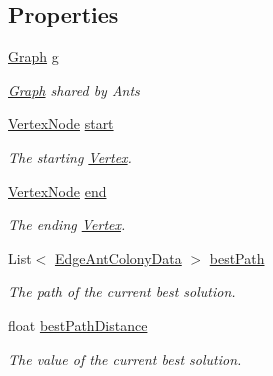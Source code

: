 \subsection*{Properties}
\begin{DoxyCompactItemize}
\item 
\hyperlink{classGraph}{Graph} \hyperlink{classCommonKnowledge_afe6268d0091d9477d594b7207a9b0d8b}{g}
\begin{DoxyCompactList}\small\item\em \hyperlink{classGraph}{Graph} shared by Ants\end{DoxyCompactList}\item 
\hyperlink{classVertexNode}{Vertex\+Node} \hyperlink{classCommonKnowledge_a968607c5b3027dc7db9178375a2071f2}{start}
\begin{DoxyCompactList}\small\item\em The starting \hyperlink{structVertex}{Vertex}.\end{DoxyCompactList}\item 
\hyperlink{classVertexNode}{Vertex\+Node} \hyperlink{classCommonKnowledge_a32a5f87ad72c95bbe3e3aabca913a5a6}{end}
\begin{DoxyCompactList}\small\item\em The ending \hyperlink{structVertex}{Vertex}.\end{DoxyCompactList}\item 
List$<$ \hyperlink{classEdgeAntColonyData}{Edge\+Ant\+Colony\+Data} $>$ \hyperlink{classCommonKnowledge_a1bcd984ab757e6cd11f7b568fb509104}{best\+Path}
\begin{DoxyCompactList}\small\item\em The path of the current best solution.\end{DoxyCompactList}\item 
float \hyperlink{classCommonKnowledge_a6f2a9fec7495d2ce0cf70db304bd28a9}{best\+Path\+Distance}
\begin{DoxyCompactList}\small\item\em The value of the current best solution.\end{DoxyCompactList}\item 

\end{DoxyCompactItemize}
